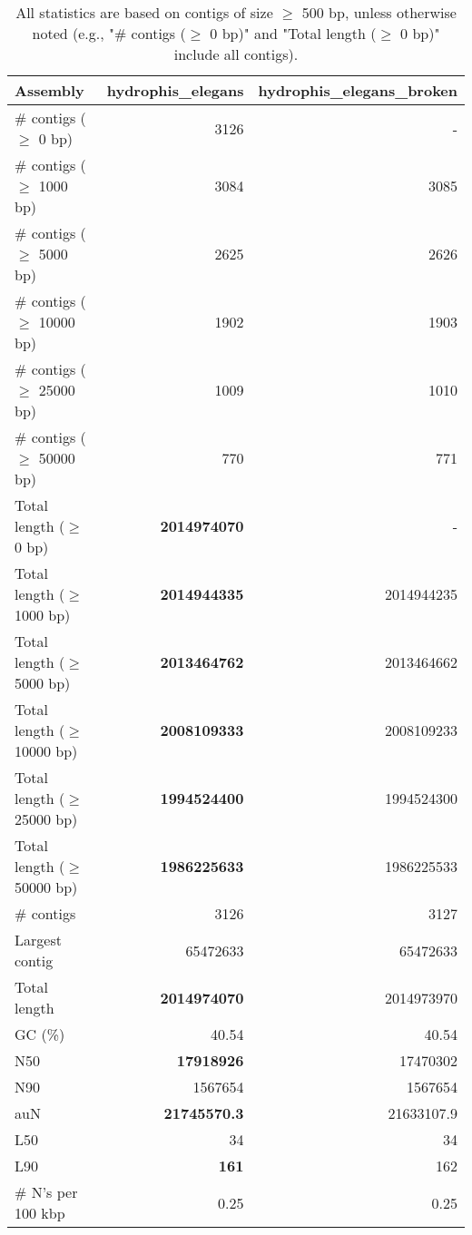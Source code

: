 \documentclass[12pt,a4paper]{article}
\begin{document}
\begin{table}[ht]
\begin{center}
\caption{All statistics are based on contigs of size $\geq$ 500 bp, unless otherwise noted (e.g., "\# contigs ($\geq$ 0 bp)" and "Total length ($\geq$ 0 bp)" include all contigs).}
\begin{tabular}{|l*{2}{|r}|}
\hline
Assembly & hydrophis\_elegans & hydrophis\_elegans\_broken \\ \hline
\# contigs ($\geq$ 0 bp) & 3126 & - \\ \hline
\# contigs ($\geq$ 1000 bp) & 3084 & 3085 \\ \hline
\# contigs ($\geq$ 5000 bp) & 2625 & 2626 \\ \hline
\# contigs ($\geq$ 10000 bp) & 1902 & 1903 \\ \hline
\# contigs ($\geq$ 25000 bp) & 1009 & 1010 \\ \hline
\# contigs ($\geq$ 50000 bp) & 770 & 771 \\ \hline
Total length ($\geq$ 0 bp) & {\bf 2014974070} & - \\ \hline
Total length ($\geq$ 1000 bp) & {\bf 2014944335} & 2014944235 \\ \hline
Total length ($\geq$ 5000 bp) & {\bf 2013464762} & 2013464662 \\ \hline
Total length ($\geq$ 10000 bp) & {\bf 2008109333} & 2008109233 \\ \hline
Total length ($\geq$ 25000 bp) & {\bf 1994524400} & 1994524300 \\ \hline
Total length ($\geq$ 50000 bp) & {\bf 1986225633} & 1986225533 \\ \hline
\# contigs & 3126 & 3127 \\ \hline
Largest contig & 65472633 & 65472633 \\ \hline
Total length & {\bf 2014974070} & 2014973970 \\ \hline
GC (\%) & 40.54 & 40.54 \\ \hline
N50 & {\bf 17918926} & 17470302 \\ \hline
N90 & 1567654 & 1567654 \\ \hline
auN & {\bf 21745570.3} & 21633107.9 \\ \hline
L50 & 34 & 34 \\ \hline
L90 & {\bf 161} & 162 \\ \hline
\# N's per 100 kbp & 0.25 & 0.25 \\ \hline
\end{tabular}
\end{center}
\end{table}
\end{document}
